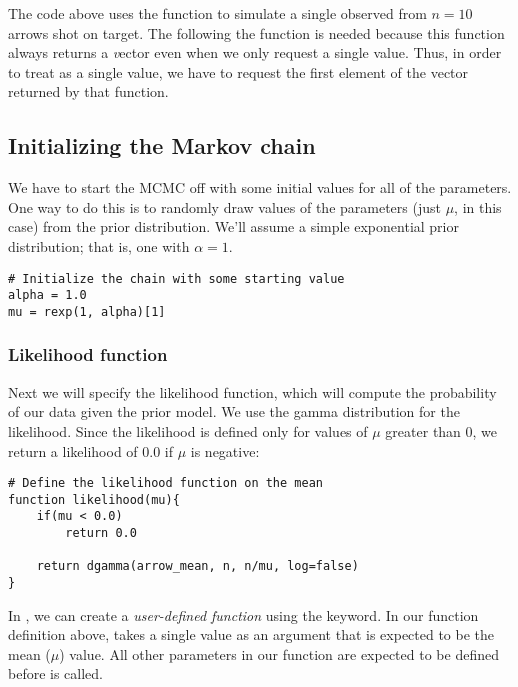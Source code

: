 The \Rev code above uses the  function to simulate a single observed  from $n=10$ arrows shot on target.
The \cl{[1]} following the  function is needed because this function always returns a {\emph vector} even when we only request a single value. Thus, in order to treat  as a single value, we have to request the first element of the vector returned by that function.


\subsection{Initializing the Markov chain}
We have to start the MCMC off with some initial values for all of the parameters.
One way to do this is to randomly draw values of the parameters (just $\mu$, in this case) from the prior distribution.
We'll assume a simple exponential prior distribution; that is, one with $\alpha = 1$.
{\tt \begin{snugshade*}
\begin{lstlisting}
# Initialize the chain with some starting value
alpha = 1.0
mu = rexp(1, alpha)[1]
\end{lstlisting}
\end{snugshade*}}



\subsubsection{Likelihood function}
Next we will specify the likelihood function, which will compute the probability of our data given the prior model.
We use the gamma distribution for the likelihood. Since the likelihood is defined only for values of $\mu$ greater than 0, we return a likelihood of 0.0 if $\mu$ is negative:
{\tt \begin{snugshade*}
\begin{lstlisting}
# Define the likelihood function on the mean 
function likelihood(mu){
    if(mu < 0.0)
        return 0.0

    return dgamma(arrow_mean, n, n/mu, log=false)
}
\end{lstlisting}
\end{snugshade*}}

In \Rev, we can create a {\em user-defined function} using the  keyword. In our function definition above,  takes a single value as an argument that is expected to be the mean ($\mu$) value.
All other parameters in our function are expected to be defined before  is called.


